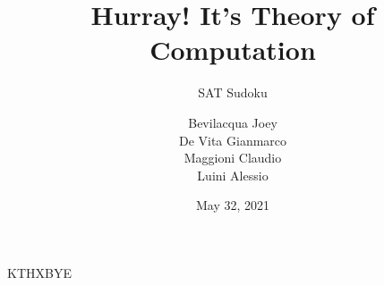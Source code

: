 \documentclass[t,aspectratio=1610]{beamer}
\title{Hurray! It's Theory of Computation}
\subtitle{\Large{SAT Sudoku}}
\author{Bevilacqua Joey \\ De Vita Gianmarco \\ Maggioni Claudio \\ Luini Alessio}
\institute{Universit\`a della Svizzera Italiana\\ Faculty of Informatics\\ \href{http://www.unisi.ch}{www.unisi.ch}}
\date{May 32, 2021}
\begin{document}
{
%
\begin{frame}
\maketitle
\end{frame}
}

\begin{frame}
KTHXBYE
\end{frame}

{
\begin{frame}
\end{frame}
}
\end{document}
